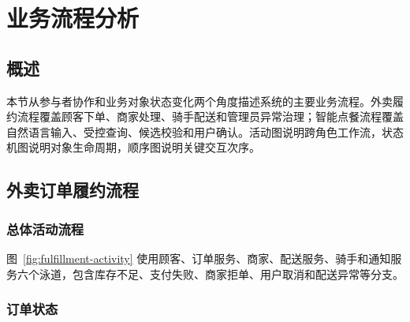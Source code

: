 \section{业务流程分析}

\subsection{概述}

本节从参与者协作和业务对象状态变化两个角度描述系统的主要业务流程。外卖履约流程覆盖顾客下单、商家处理、骑手配送和管理员异常治理；智能点餐流程覆盖自然语言输入、受控查询、候选校验和用户确认。活动图说明跨角色工作流，状态机图说明对象生命周期，顺序图说明关键交互次序。

\subsection{外卖订单履约流程}

\subsubsection{总体活动流程}


图~\ref{fig:fulfillment-activity} 使用顾客、订单服务、商家、配送服务、骑手和通知服务六个泳道，包含库存不足、支付失败、商家拒单、用户取消和配送异常等分支。

\subsubsection{订单状态}


